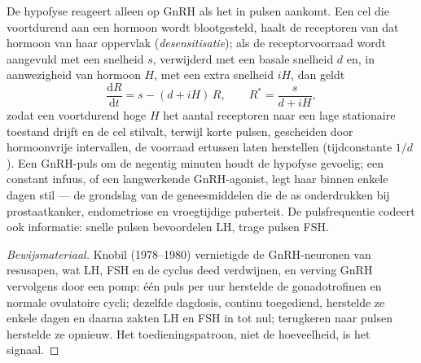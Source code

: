 \begin{proposition}\label{prop:b2:reproductive-hormones:pulses}
De hypofyse reageert alleen op GnRH als het in pulsen aankomt. Een cel die
voortdurend aan een hormoon wordt blootgesteld, haalt de receptoren van
dat hormoon van haar oppervlak (\emph{desensitisatie}); als de
receptorvoorraad wordt aangevuld met een snelheid $s$, verwijderd met een
basale snelheid $d$ en, in aanwezigheid van hormoon $H$, met een extra
snelheid $iH$, dan geldt
\[
\frac{\mathrm{d}R}{\mathrm{d}t} = s - (d + iH)\,R, \qquad R^* = \frac{s}{d + iH},
\]
zodat een voortdurend hoge $H$ het aantal receptoren naar een lage
stationaire toestand drijft en de cel stilvalt, terwijl korte pulsen,
gescheiden door hormoonvrije intervallen, de voorraad ertussen laten
herstellen (tijdconstante $1/d$). Een GnRH-puls om de negentig
minuten houdt de hypofyse gevoelig; een constant infuus, of een langwerkende
GnRH-agonist, legt haar binnen enkele dagen stil --- de grondslag van de
geneesmiddelen die de as onderdrukken bij prostaatkanker, endometriose en
vroegtijdige puberteit. De pulsfrequentie codeert ook informatie:
snelle pulsen bevoordelen LH, trage pulsen FSH.
\end{proposition}
\begin{proof}[Bewijsmateriaal]
Knobil (1978--1980) vernietigde de GnRH-neuronen van resusapen, wat LH,
FSH en de cyclus deed verdwijnen, en verving GnRH vervolgens door een
pomp: één puls per uur herstelde de gonadotrofinen en normale
ovulatoire cycli; dezelfde dagdosis, continu toegediend, herstelde ze
enkele dagen en daarna zakten LH en FSH in tot nul; terugkeren naar
pulsen herstelde ze opnieuw. Het toedieningspatroon, niet de hoeveelheid,
is het signaal.
\end{proof}

